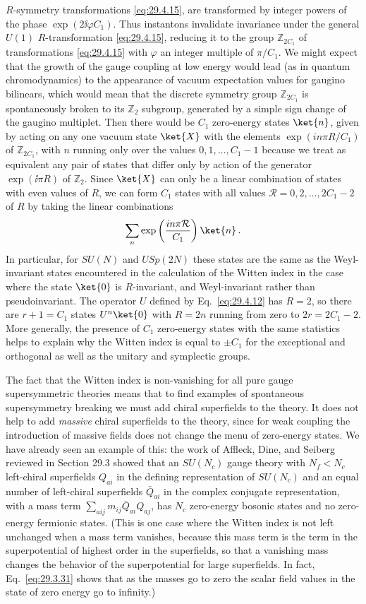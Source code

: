 \(R\)-symmetry transformations \eqref{eq:29.4.15}, are transformed by
integer powers of the phase \(\exp(2\ii\varphi C_1)\). Thus instantons
invalidate invariance under the general \(U(1)\) \(R\)-transformation
\eqref{eq:29.4.15}, reducing it to the group \(\mathbb{Z}_{2C_1}\) of
transformations \eqref{eq:29.4.15} with \(\varphi\) an integer multiple of
\(\pi/C_1\). We might expect that the growth of the gauge coupling at low
energy would lead (as in quantum chromodynamics) to the appearance of
vacuum expectation values for gaugino bilinears, which would mean that the
discrete symmetry group \(\mathbb{Z}_{2C_1}\) is spontaneously broken to
its \(\mathbb{Z}_2\) subgroup, generated by a simple sign change of the
gaugino multiplet. Then there would be \(C_1\) zero-energy states
\(\ket{n}\), given by acting on any one vacuum state \(\ket{X}\) with the
elements \(\exp(in\pi R/C_1)\) of \(\mathbb{Z}_{2C_1}\), with \(n\)
running only over the values \(0,1,\ldots,C_1-1\) because we treat as
equivalent any pair of states that differ only by action of the generator
\(\exp(\ii\pi R)\) of \(\mathbb{Z}_2\). Since \(\ket{X}\) can only be a
linear combination of states with even values of \(R\), we can form
\(C_1\) states with all values \(\mathcal{R}=0,2,\ldots,2C_1-2\) of \(R\)
by taking the linear combinations
\[
  \sum_n\exp\left(\frac{in\pi\mathcal{R}}{C_1}\right)\ket{n}\,.
\]
In particular, for \(SU(N)\) and \(USp(2N)\) these states are the same as
the Weyl-invariant states encountered in the calculation of the Witten
index in the case where the state \(\ket{0}\) is \(R\)-invariant, and
Weyl-invariant rather than pseudoinvariant. The operator \(U\) defined by
Eq.~\eqref{eq:29.4.12} has \(R=2\), so there are \(r+1=C_1\) states
\(U^n\ket{0}\) with \(R=2n\) running from zero to \(2r=2C_1-2\). More
generally, the presence of \(C_1\) zero-energy states with the same
statistics helps to explain why the Witten index is equal to \(\pm C_1\)
for the exceptional and orthogonal as well as the unitary and symplectic
groups.

The fact that the Witten index is non-vanishing for all pure gauge
supersymmetric theories means that to find examples of spontaneous
supersymmetry breaking we must add chiral superfields to the theory. It
does not help to add \emph{massive} chiral superfields to the theory, since
for weak coupling the introduction of massive fields does not change the
menu of zero-energy states. We have already seen an example of this: the
work of Affleck, Dine, and Seiberg reviewed in Section 29.3 showed that an
\(SU(N_c)\) gauge theory with \(N_f<N_c\) left-chiral superfields
\(Q_{ai}\) in the defining representation of \(SU(N_c)\) and an equal
number of left-chiral superfields \(\bar Q_{ai}\) in the complex conjugate
representation, with a mass term
\(\sum_{aij}m_{ij}\bar Q_{ai}Q_{aj}\), has \(N_c\) zero-energy bosonic
states and no zero-energy fermionic states. (This is one case where the
Witten index is not left unchanged when a mass term vanishes, because this
mass term is the term in the superpotential of highest order in the
superfields, so that a vanishing mass changes the behavior of the
superpotential for large superfields. In fact, Eq.~\eqref{eq:29.3.31}
shows that as the masses go to zero the scalar field values in the state of
zero energy go to infinity.)

